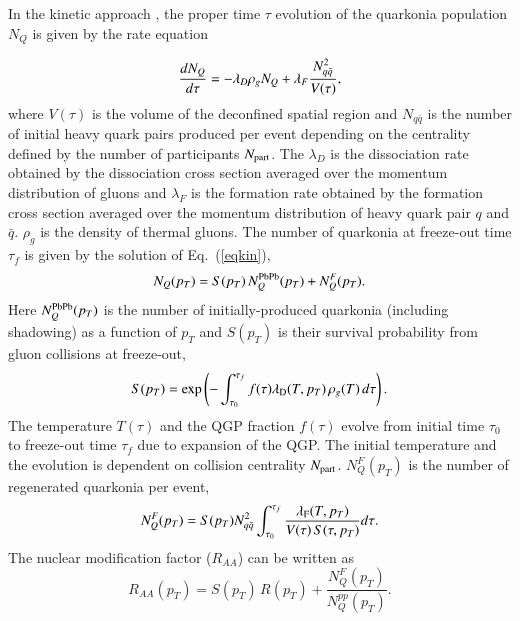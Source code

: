 {\color{black}

  In the kinetic approach \cite{Thews:2000rj}, the proper time $\tau$ evolution of the quarkonia 
  population $N_{Q}$
  is given by the rate equation 
  
  \begin{equation}\label{eqkin}
    {dN_{Q} \over d\tau}  =  - \lambda_D  \rho_g N_{Q} + \lambda_F {N_{q \bar{q}}^{2} \over V(\tau)},
  \end{equation}
  where $V(\tau)$ is the volume of the deconfined spatial region and $N_{q \bar{q}}$ is the number of initial 
  heavy quark pairs produced per event depending on the centrality defined by the number of participants
  $N_{\rm part}$.
  The $\lambda_{D}$ is the dissociation rate obtained by the dissociation cross section averaged over 
  the momentum 
  distribution of gluons and $\lambda_{F}$ is the formation rate obtained by the formation cross section 
  averaged over the momentum distribution of heavy quark pair $q$ and $\bar{q}$. 
  $\rho_g$ is the density of thermal gluons.
  The number of quarkonia at freeze-out time $\tau_f$ is given by the solution of Eq.~(\ref{eqkin}),
  \begin{equation}
    N_{Q}(p_T) = S(p_T) \,N_{Q}^{\rm PbPb}(p_T)+N_{Q}^F(p_T).
    \label{eqbeta}
  \end{equation}
  Here $N_{Q}^{\rm PbPb}(p_T)$ is the number of initially-produced quarkonia (including shadowing)
  as a function of $p_T$ and $S(p_T)$ is their survival probability from gluon collisions at freeze-out, 
  \begin{equation}
    S(p_T) = \exp \left( {-\int_{\tau_0}^{\tau_f}f(\tau) \lambda_{\rm D}(T,p_T)\,\rho_g(T)\,d\tau} \right).
  \end{equation}
  The temperature $T(\tau)$ and the QGP fraction $f(\tau)$ evolve from initial time $\tau_0$ 
  to freeze-out time $\tau_f$ due to expansion of the QGP. The initial temperature and the 
  evolution is dependent on collision centrality $N_{\rm part}$.
  $N_{Q}^F(p_T)$ is the number of regenerated quarkonia per event,
  \begin{equation}
    N_{Q}^F(p_T)=S(p_T)N_{q \bar{q}}^{2} \int_{\tau_0}^{\tau_f}{{\lambda_{\mathrm{F}}(T,p_T) \over V(\tau)\,S(\tau,p_T)} d\tau}.
  \end{equation}
  The nuclear modification factor ($R_{AA}$) can be written as 
  \begin{equation}
    R_{AA}(p_T)=S(p_T) \, R(p_T) + \frac{N_{Q}^F(p_T)}{N_{Q}^{pp}(p_T)}.
    \label{raa}
  \end{equation}
}
